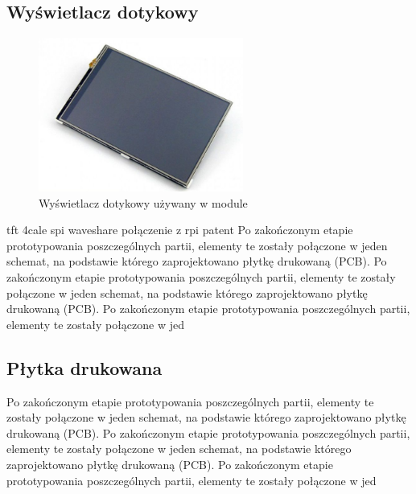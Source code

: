 \documentclass[12pt, eng, twoside, openany, final]{mgr}
\begin{document}
        \subsection{Wyświetlacz dotykowy}
            \begin{figure}[H]
            \begin{center}
                \includegraphics[width=0.6\textwidth]{wyswietlacz.jpg}
                \caption{Wyświetlacz dotykowy używany w module} 
            \end{center}
            \end{figure}
            tft 4cale spi waveshare połączenie z rpi patent
             Po zakończonym etapie prototypowania poszczególnych partii, elementy te zostały połączone w jeden schemat, na podstawie którego zaprojektowano płytkę drukowaną (PCB). 
            Po zakończonym etapie prototypowania poszczególnych partii, elementy te zostały połączone w jeden schemat, na podstawie którego zaprojektowano płytkę drukowaną (PCB). 
            Po zakończonym etapie prototypowania poszczególnych partii, elementy te zostały połączone w jed
        
        \subsection{Płytka drukowana}
            Po zakończonym etapie prototypowania poszczególnych partii, elementy te zostały połączone w jeden schemat, na podstawie którego zaprojektowano płytkę drukowaną (PCB). 
            Po zakończonym etapie prototypowania poszczególnych partii, elementy te zostały połączone w jeden schemat, na podstawie którego zaprojektowano płytkę drukowaną (PCB). 
            Po zakończonym etapie prototypowania poszczególnych partii, elementy te zostały połączone w jed
            
\end{document}

